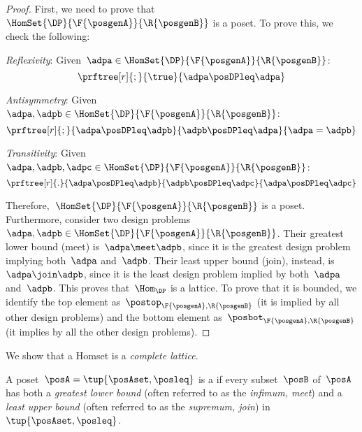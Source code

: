 \begin{proof}
    First, we need to prove that~$\HomSet{\DP}{\F{\posgenA}}{\R{\posgenB}}$ is a poset.
    To prove this, we check the following:
    \begin{compactitem}
        \item \emph{Reflexivity}: Given~$\adpa\in \HomSet{\DP}{\F{\posgenA}}{\R{\posgenB}}$:
              \begin{equation*}
                  \prftree[r]{;}{\true}{\adpa\posDPleq \adpa}
              \end{equation*}
        \item \emph{Antisymmetry}: Given~$\adpa,\adpb\in \HomSet{\DP}{\F{\posgenA}}{\R{\posgenB}}$:
              \begin{equation*}
                  \prftree[r]{;}{\adpa\posDPleq \adpb}{\adpb\posDPleq \adpa}{\adpa=\adpb}
              \end{equation*}
        \item \emph{Transitivity}: Given~$\adpa,\adpb,\adpc\in \HomSet{\DP}{\F{\posgenA}}{\R{\posgenB}}$:
              \begin{equation*}
                  \prftree[r]{.}{\adpa\posDPleq \adpb}{\adpb\posDPleq \adpc}{\adpa \posDPleq \adpc}
              \end{equation*}
    \end{compactitem}
    Therefore,~$\HomSet{\DP}{\F{\posgenA}}{\R{\posgenB}}$ is a poset.
    Furthermore, consider two design problems~$\adpa,\adpb\in \HomSet{\DP}{\F{\posgenA}}{\R{\posgenB}}$.
    Their greatest lower bound (meet) is~$\adpa\meet\adpb$, since it is the greatest design problem implying both~$\adpa$ and~$\adpb$.
    Their least upper bound (join), instead, is~$\adpa\join \adpb$, since it is the least design problem implied by both~$\adpa$ and~$\adpb$.
    This proves that~$\Hom_\DP$ is a lattice.
    To prove that it is bounded, we identify the top element as~$\postop_{\F{\posgenA},\R{\posgenB}}$ (it is implied by all other design problems) and the bottom element as~$\posbot_{\F{\posgenA},\R{\posgenB}}$ (it implies by all the other design problems).
\end{proof}

We show that a \DP Homset is a \emph{complete lattice}.

\begin{definition}
    \label{def:complete-lattice}
    A poset~$\posA=\tup{\posAset,\posleq}$ is a \emph{} if every subset~$\posB$ of~$\posA$ has both a \emph{greatest lower bound} (often referred to as the \emph{infimum, meet}) and a \emph{least upper bound} (often referred to as the \emph{supremum, join}) in~$\tup{\posAset, \posleq}$.
\end{definition}

